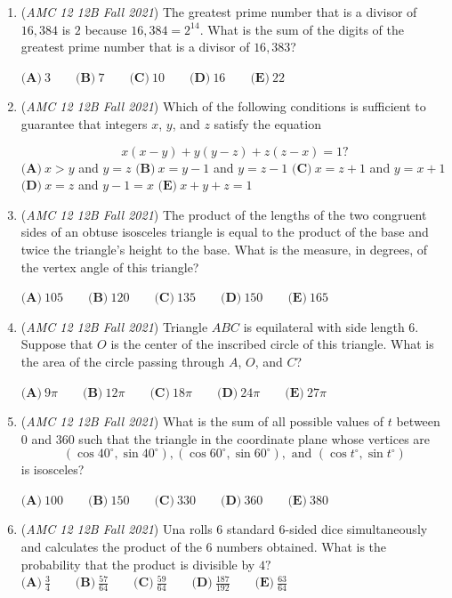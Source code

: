 \begin{enumerate}
	\item (\textit{AMC 12 12B Fall 2021}) The greatest prime number that is a divisor of $16{,}384$ is $2$ because $16{,}384 = 2^{14}$. What is the sum of the digits of the greatest prime number that is a divisor of $16{,}383$?


 $\textbf{(A)} \: 3\qquad\textbf{(B)} \: 7\qquad\textbf{(C)} \: 10\qquad\textbf{(D)} \: 16\qquad\textbf{(E)} \: 22$


	\item (\textit{AMC 12 12B Fall 2021}) Which of the following conditions is sufficient to guarantee that integers $x$, $y$, and $z$ satisfy the equation

 \[x(x-y)+y(y-z)+z(z-x) = 1?\]
$\textbf{(A)} \: x>y$ and $y=z$
$\textbf{(B)} \: x=y-1$ and $y=z-1$
$\textbf{(C)} \: x=z+1$ and $y=x+1$
$\textbf{(D)} \: x=z$ and $y-1=x$
$\textbf{(E)} \: x+y+z=1$


	\item (\textit{AMC 12 12B Fall 2021}) The product of the lengths of the two congruent sides of an obtuse isosceles triangle is equal to the product of the base and twice the triangle's height to the base. What is the measure, in degrees, of the vertex angle of this triangle?


 $\textbf{(A)} \: 105 \qquad\textbf{(B)} \: 120 \qquad\textbf{(C)} \: 135 \qquad\textbf{(D)} \: 150 \qquad\textbf{(E)} \: 165$


	\item (\textit{AMC 12 12B Fall 2021}) Triangle $ABC$ is equilateral with side length $6$. Suppose that $O$ is the center of the inscribed
circle of this triangle. What is the area of the circle passing through $A$, $O$, and $C$?


 $\textbf{(A)} \: 9\pi \qquad\textbf{(B)} \: 12\pi \qquad\textbf{(C)} \: 18\pi \qquad\textbf{(D)} \: 24\pi \qquad\textbf{(E)} \: 27\pi$


	\item (\textit{AMC 12 12B Fall 2021}) What is the sum of all possible values of $t$ between $0$ and $360$ such that the triangle in the coordinate plane whose vertices are 
 \[(\cos 40^\circ,\sin 40^\circ), (\cos 60^\circ,\sin 60^\circ), \text{ and } (\cos t^\circ,\sin t^\circ)\]
is isosceles? 


 $\textbf{(A)} \: 100 \qquad\textbf{(B)} \: 150 \qquad\textbf{(C)} \: 330 \qquad\textbf{(D)} \: 360 \qquad\textbf{(E)} \: 380$


	\item (\textit{AMC 12 12B Fall 2021}) Una rolls $6$ standard $6$-sided dice simultaneously and calculates the product of the $6{ }$ numbers obtained. What is the probability that the product is divisible by $4?$
$\textbf{(A)}\: \frac34\qquad\textbf{(B)} \: \frac{57}{64}\qquad\textbf{(C)} \: \frac{59}{64}\qquad\textbf{(D)} \: \frac{187}{192}\qquad\textbf{(E)} \: \frac{63}{64}$



\end{enumerate}
